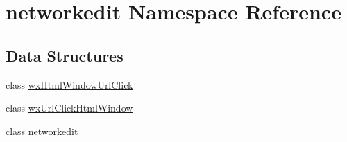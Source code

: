 \hypertarget{namespacenetworkedit}{
\section{networkedit Namespace Reference}
\label{namespacenetworkedit}
}


\subsection*{Data Structures}
\begin{CompactItemize}
\item 
class \hyperlink{classnetworkedit_1_1wxHtmlWindowUrlClick}{wx\-Html\-Window\-Url\-Click}
\item 
class \hyperlink{classnetworkedit_1_1wxUrlClickHtmlWindow}{wx\-Url\-Click\-Html\-Window}
\item 
class \hyperlink{classnetworkedit_1_1networkedit}{networkedit}
\end{CompactItemize}
